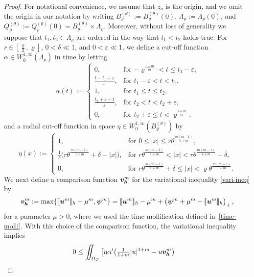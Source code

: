 \documentclass[a4paper, 10pt, american]{amsart}
\numberwithin{theorem}{section}
\numberwithin{equation}{section}
\renewcommand{\epsilon}{\varepsilon}
\renewcommand{\epsilon}{\varepsilon}
\renewcommand{\rho}{\varrho}
\newcommand{\power}[2]{\bm{#1^{\mbox{\unboldmath{\scriptsize$#2$}}}}}
\begin{document}
\begin{proof}
For notational convenience, we assume that $z_o$ is the origin, and we
omit the origin in our notation by writing $B_\rho^{(\theta)}:=B_\rho^{(\theta)}(0)$, $\Lambda_\rho:=\Lambda_\rho(0)$, and $Q_\rho^{(\theta)}:=Q_\rho^{(\theta)}(0)=B_\rho^{(\theta)}\times\Lambda_\rho$. 
Moreover, without loss of generality we suppose that
$t_1,t_2\in\Lambda_\rho$ are ordered in the way that $t_1<t_2$ holds true.
For $r \in [\frac\rho2, \rho]$, $0<\delta\ll1$, and $0<\varepsilon\ll 1$, we
define a cut-off function 
$\alpha\in W^{1,\infty}_0(\Lambda_\rho)$ in time by letting
$$
	\alpha(t)
	:=
	\left\{
	\begin{array}{cl}
	0 ,& \mbox{for $-\rho^{\frac{1+m}{m}}< t\le t_1-\epsilon$,}\\[3pt]
	\frac{t-t_1+\epsilon}{\epsilon}, & \mbox{for $t_1-\epsilon< t< t_1$,}\\[3pt]
	1 ,& \mbox{for $t_1\le t\le t_2$,}\\[3pt]
	\frac{t_2+\epsilon-t}{\epsilon}, & \mbox{for $t_2< t< t_2+\epsilon$,}\\[3pt]
	0 ,& \mbox{for $t_2+\epsilon\le t < \rho^{\frac{1+m}{m}}$,}
	\end{array}
	\right.
$$
and a radial cut-off function in space $\eta \in W^{1,\infty}_0(B_\rho^{(\theta)})$ by 
$$
	\eta(x)
	:=
	\left\{
	\begin{array}{cl}
	1 ,& \mbox{for $0\le |x|\le r\theta^{\frac{m(m-1)}{1+m}}$,}\\[3pt]
	\frac1\delta\big(r\theta^{\frac{m(m-1)}{1+m}}+\delta-|x|\big), & \mbox{for $r\theta^{\frac{m(m-1)}{1+m}}< |x|< r\theta^{\frac{m(m-1)}{1+m}}+\delta$,}\\[3pt]
	0 ,& \mbox{for $r\theta^{\frac{m(m-1)}{1+m}}+\delta\le |x| < \rho\theta^{\frac{m(m-1)}{1+m}}$.}
	\end{array}
	\right.
$$
We next define a comparison function $\power {v_h} m$ for the variational inequality \eqref{vari-ineq} by
\begin{equation*}
  \power{v_h}{m}:=\max\{\llbracket
  \power{u}{m}\rrbracket_h-\mu^m,\power{\psi}{m}\}
  =
  \llbracket \power{u}{m}\rrbracket_h-\mu^m+\big(\power{\psi}{m}+\mu^m-\llbracket
  \power{u}{m}\rrbracket_h\big)_+\,,
\end{equation*}
for a parameter $\mu>0$, where we used the time mollification defined
in~\eqref{time-molli}. With this choice of the comparison function,
the variational inequality implies 
\begin{align}\label{var-in-obst}
  0&\le
  \iint_{\Omega_T}\big[\eta\alpha'\big(\tfrac1{1+m}|u|^{1+m}-u\power{v_h}{m}\big)

\end{align}
\end{proof}
\end{document}
